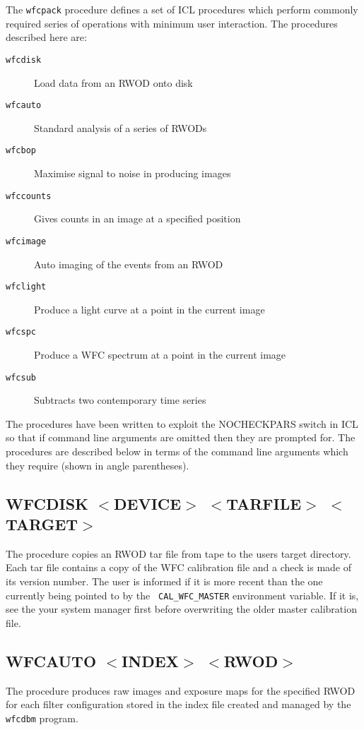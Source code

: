 The {\tt wfcpack} procedure defines a set of ICL procedures which perform
commonly required series of operations with minimum user interaction.
The procedures described here are:

\begin{description}
\item [{\tt wfcdisk}]   Load data from an RWOD onto disk
\item [{\tt wfcauto} ]  Standard analysis of a series of RWODs
\item [{\tt wfcbop}]    Maximise signal to noise in producing images
\item [{\tt wfccounts}] Gives counts in an image at a specified position
\item [{\tt wfcimage}]  Auto imaging of the events from an RWOD
\item [{\tt wfclight}]  Produce a light curve at a point in the current image
\item [{\tt wfcspc}]    Produce a WFC spectrum at a point in the current image
\item [{\tt wfcsub}]    Subtracts two contemporary time series
\end{description}

The procedures have been written to exploit the NOCHECKPARS switch in
ICL so that if command line arguments are omitted then they are
prompted for.  The procedures are described below in terms of the
command line arguments which they require (shown in angle
parentheses).

\subsection{WFCDISK $<$DEVICE$>$ $<$TARFILE$>$ $<$TARGET$>$}
\label{sec:procedures:wfcdisk}

The procedure copies an RWOD tar file from tape to the users target
directory.  Each tar file contains a copy of the WFC calibration file
and a check is made of its version number.  The user is informed if it
is more recent than the one currently being pointed to by the {\tt
CAL\_WFC\_MASTER} environment variable.  If it is, see the your system
manager first before overwriting the older master calibration file.

\subsection{WFCAUTO $<$INDEX$>$ $<$RWOD$>$}
\label{sec:procedures:wfcauto}

The procedure produces raw images and exposure maps for the specified
RWOD for each filter configuration stored in the index file
created and managed by the {\tt wfcdbm} program.


